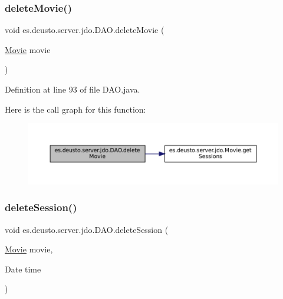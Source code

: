 \subsubsection{\texorpdfstring{deleteMovie()}{deleteMovie()}\hspace{0.1cm}{\footnotesize\ttfamily [2/2]}}
{\footnotesize\ttfamily void es.\+deusto.\+server.\+jdo.\+D\+A\+O.\+delete\+Movie (\begin{DoxyParamCaption}\item[{\mbox{\hyperlink{classes_1_1deusto_1_1server_1_1jdo_1_1_movie}{Movie}}}]{movie }\end{DoxyParamCaption})}



Definition at line 93 of file D\+A\+O.\+java.

Here is the call graph for this function\+:
\nopagebreak
\begin{figure}[H]
\begin{center}
\leavevmode
\includegraphics[width=350pt]{classes_1_1deusto_1_1server_1_1jdo_1_1_d_a_o_a479ca9a8597aada4e74445699140e0fd_cgraph}
\end{center}
\end{figure}
\mbox{\label{classes_1_1deusto_1_1server_1_1jdo_1_1_d_a_o_a399605bc2a2fd86679ddf7793b71de12}} 
\subsubsection{\texorpdfstring{deleteSession()}{deleteSession()}\hspace{0.1cm}{\footnotesize\ttfamily [1/2]}}
{\footnotesize\ttfamily void es.\+deusto.\+server.\+jdo.\+D\+A\+O.\+delete\+Session (\begin{DoxyParamCaption}\item[{\mbox{\hyperlink{classes_1_1deusto_1_1server_1_1jdo_1_1_movie}{Movie}}}]{movie,  }\item[{Date}]{time }\end{DoxyParamCaption})}



